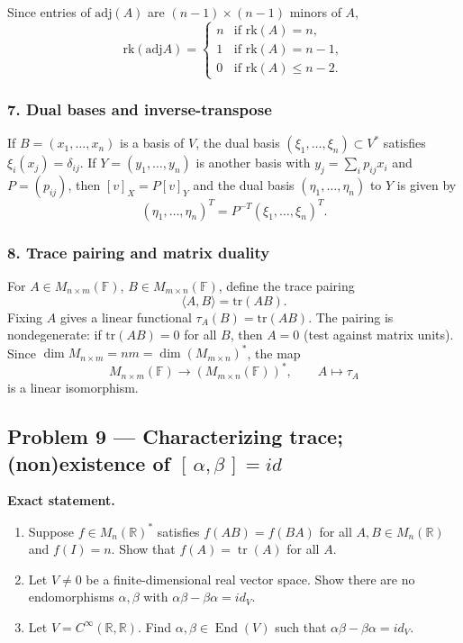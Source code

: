 \documentclass[12pt,a4paper]{article}
\theoremstyle{plain}
\theoremstyle{definition}      %
\begin{document}
Since entries of \(\mathrm{adj}(A)\) are \((n-1)\times(n-1)\) minors of \(A\),
\[
\mathrm{rk}(\mathrm{adj}A)=
\begin{cases}
	n & \text{if }\mathrm{rk}(A)=n,\\
	1 & \text{if }\mathrm{rk}(A)=n-1,\\
	0 & \text{if }\mathrm{rk}(A)\le n-2.
\end{cases}
\]

\subsubsection*{7. Dual bases and inverse-transpose}
If \(B=(x_1,\dots,x_n)\) is a basis of \(V\), the dual basis \((\xi_1,\dots,\xi_n)\subset V^*\) satisfies
\(\xi_i(x_j)=\delta_{ij}\).
If \(Y=(y_1,\dots,y_n)\) is another basis with \(y_j=\sum_i p_{ij}x_i\) and \(P=(p_{ij})\), then
\([v]_X=P[v]_Y\) and the dual basis \((\eta_1,\dots,\eta_n)\) to \(Y\) is given by
\[
(\eta_1,\dots,\eta_n)^T=P^{-T}(\xi_1,\dots,\xi_n)^T.
\]

\subsubsection*{8. Trace pairing and matrix duality}
For \(A\in M_{n\times m}(\mathbb F)\), \(B\in M_{m\times n}(\mathbb F)\), define the trace pairing
\[
\langle A,B\rangle=\mathrm{tr}(AB).
\]
Fixing \(A\) gives a linear functional \(\tau_A(B)=\mathrm{tr}(AB)\).
The pairing is nondegenerate: if \(\mathrm{tr}(AB)=0\) for all \(B\), then \(A=0\) (test against matrix units).
Since \(\dim M_{n\times m}=nm=\dim (M_{m\times n})^*\), the map
\[
M_{n\times m}(\mathbb F)\to (M_{m\times n}(\mathbb F))^*,\qquad A\mapsto\tau_A
\]
is a linear isomorphism.


\subsection*{Problem 9 — Characterizing trace; (non)existence of \([\,\alpha,\beta\,]=id\)}

\textbf{Exact statement.}
\begin{enumerate}
	\item[(a)] Suppose \(f\in M_n(\mathbb R)^*\) satisfies \(f(AB)=f(BA)\) for all \(A,B\in M_n(\mathbb R)\) and \(f(I)=n\).
	Show that \(f(A)=\operatorname{tr}(A)\) for all \(A\).
	\item[(b)] Let \(V\neq0\) be a finite-dimensional real vector space. Show there are no endomorphisms \(\alpha,\beta\) with
	\(\alpha\beta-\beta\alpha=id_V\).
	\item[(c)] Let \(V=C^\infty(\mathbb R,\mathbb R)\). Find \(\alpha,\beta\in\operatorname{End}(V)\) such that
	\(\alpha\beta-\beta\alpha=id_V\).
\end{enumerate}
\end{document}
